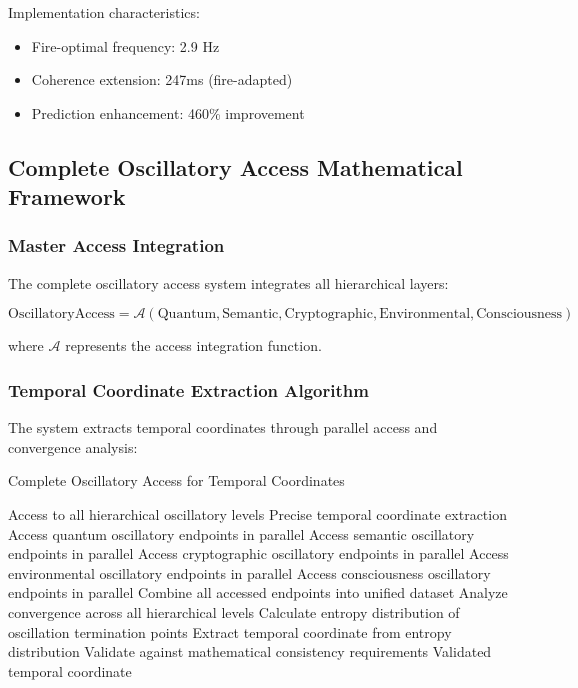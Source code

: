 \documentclass[12pt,a4paper]{article}
\begin{document}
{Implementation characteristics:
\begin{itemize}
\item Fire-optimal frequency: 2.9 Hz
\item Coherence extension: 247ms (fire-adapted)
\item Prediction enhancement: 460\% improvement
\end{itemize}

\subsection{Complete Oscillatory Access Mathematical Framework}

\subsubsection{Master Access Integration}

The complete oscillatory access system integrates all hierarchical layers:

\begin{equation}
\text{OscillatoryAccess} = \mathcal{A}(\text{Quantum}, \text{Semantic}, \text{Cryptographic}, \text{Environmental}, \text{Consciousness})
\end{equation}

where $\mathcal{A}$ represents the access integration function.

\subsubsection{Temporal Coordinate Extraction Algorithm}

The system extracts temporal coordinates through parallel access and convergence analysis:

\begin{algorithm}[H]
\caption{Complete Oscillatory Access for Temporal Coordinates}
\begin{algorithmic}[1]
\REQUIRE Access to all hierarchical oscillatory levels
\ENSURE Precise temporal coordinate extraction
\STATE Access quantum oscillatory endpoints in parallel
\STATE Access semantic oscillatory endpoints in parallel
\STATE Access cryptographic oscillatory endpoints in parallel
\STATE Access environmental oscillatory endpoints in parallel
\STATE Access consciousness oscillatory endpoints in parallel
\STATE Combine all accessed endpoints into unified dataset
\STATE Analyze convergence across all hierarchical levels
\STATE Calculate entropy distribution of oscillation termination points
\STATE Extract temporal coordinate from entropy distribution
\STATE Validate against mathematical consistency requirements
\RETURN Validated temporal coordinate
\end{algorithmic}
\end{algorithm}

}
\end{document}
